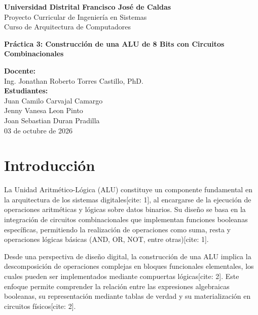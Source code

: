 \documentclass[12pt,a4paper]{article}
\begin{document}
\begin{titlepage}
    \centering
    {\Large \textbf{Universidad Distrital Francisco José de Caldas} \\[0.3cm]}
    {\large Proyecto Curricular de Ingeniería en Sistemas \\[0.2cm]}
    {\large Curso de Arquitectura de Computadores \\[1.5cm]}
    
    {\huge \textbf{Práctica 3: Construcción de una ALU de 8 Bits con Circuitos Combinacionales} \\[2cm]}
    
    \textbf{Docente:} \\
    Ing. Jonathan Roberto Torres Castillo, PhD. \\[1cm]
    
    \textbf{Estudiantes:} \\
    Juan Camilo Carvajal Camargo \\
    Jenny Vanesa Leon Pinto \\Joan Sebastian Duran Pradilla\\[2cm]
    
    \vfill
    {\large 03 de octubre de 2026}
\end{titlepage}

\newpage

\tableofcontents
\newpage

\section{Introducción}

La Unidad Aritmético-Lógica (ALU) constituye un componente fundamental en la arquitectura de los sistemas digitales[cite: 1], al encargarse de la ejecución de operaciones aritméticas y lógicas sobre datos binarios. Su diseño se basa en la integración de circuitos combinacionales que implementan funciones booleanas específicas, permitiendo la realización de operaciones como suma, resta y operaciones lógicas básicas (AND, OR, NOT, entre otras)[cite: 1].

Desde una perspectiva de diseño digital, la construcción de una ALU implica la descomposición de operaciones complejas en bloques funcionales elementales, los cuales pueden ser implementados mediante compuertas lógicas[cite: 2]. Este enfoque permite comprender la relación entre las expresiones algebraicas booleanas, su representación mediante tablas de verdad y su materialización en circuitos físicos[cite: 2].
\end{document}
